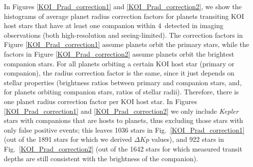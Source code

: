 \documentclass[twocolumn,appendixfloats]{aastex6}
\begin{document}
In Figures \ref{KOI_Prad_correction1} and \ref{KOI_Prad_correction2},
we show the histograms of average planet radius correction factors for 
planets transiting KOI host stars that have at least one companion within 
4\arcsec\ detected in imaging observations (both high-resolution and 
seeing-limited). The correction factors in Figure \ref{KOI_Prad_correction1} 
assume planets orbit the primary stars, while the factors in Figure 
\ref{KOI_Prad_correction2} assume planets orbit the brightest companion
stars. For all planets orbiting a certain KOI host star (primary or companion), 
the radius correction factor is the same, since it just depends on stellar 
properties (brightness ratios between primary and companion stars, and, 
for planets orbiting companion stars, ratios of stellar radii). Therefore, there 
is one planet radius correction factor per KOI host star. In Figures 
\ref{KOI_Prad_correction1} and \ref{KOI_Prad_correction2} we only include 
{\it Kepler} stars with companions that are hosts to planets, thus excluding 
those stars with only false positive events; this leaves 1036 stars in Fig.\ 
\ref{KOI_Prad_correction1} (out of the 1891 stars for which we derived 
$\Delta Kp$ values), and 922 stars in Fig.\ \ref{KOI_Prad_correction2} 
(out of the 1642 stars for which measured transit depths are still 
consistent with the brightness of the companion).
\end{document}
